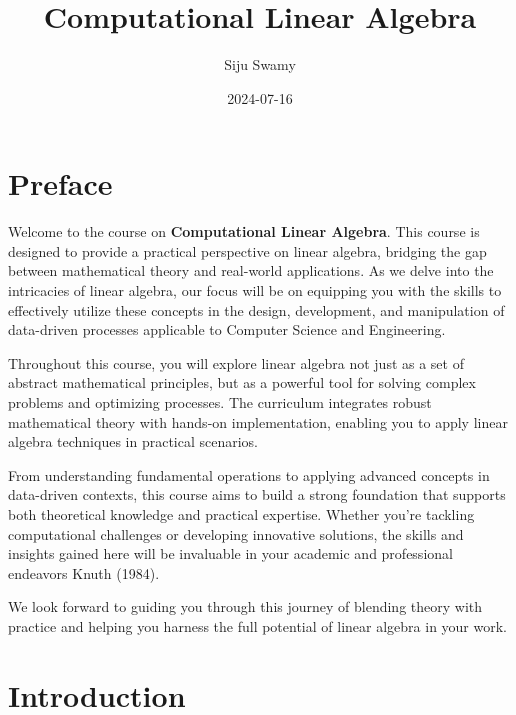 \documentclass[
  letterpaper,
  DIV=11,
  numbers=noendperiod]{scrreprt}
\title{Computational Linear Algebra}
\author{Siju Swamy}
\date{2024-07-16}
\renewcommand*\contentsname{Table of contents}
\newcommand\contentsname{Table of contents}
\theoremstyle{plain}
\theoremstyle{definition}
\theoremstyle{remark}
\begin{document}
\maketitle

\renewcommand*\contentsname{Table of contents}
{
\hypersetup{linkcolor=}
\setcounter{tocdepth}{2}
\tableofcontents
}


\chapter*{Preface}\label{preface}


Welcome to the course on \textbf{Computational Linear Algebra}. This
course is designed to provide a practical perspective on linear algebra,
bridging the gap between mathematical theory and real-world
applications. As we delve into the intricacies of linear algebra, our
focus will be on equipping you with the skills to effectively utilize
these concepts in the design, development, and manipulation of
data-driven processes applicable to Computer Science and Engineering.

Throughout this course, you will explore linear algebra not just as a
set of abstract mathematical principles, but as a powerful tool for
solving complex problems and optimizing processes. The curriculum
integrates robust mathematical theory with hands-on implementation,
enabling you to apply linear algebra techniques in practical scenarios.

From understanding fundamental operations to applying advanced concepts
in data-driven contexts, this course aims to build a strong foundation
that supports both theoretical knowledge and practical expertise.
Whether you're tackling computational challenges or developing
innovative solutions, the skills and insights gained here will be
invaluable in your academic and professional endeavors Knuth (1984).

We look forward to guiding you through this journey of blending theory
with practice and helping you harness the full potential of linear
algebra in your work.


\chapter*{Introduction}\label{introduction}
\end{document}
